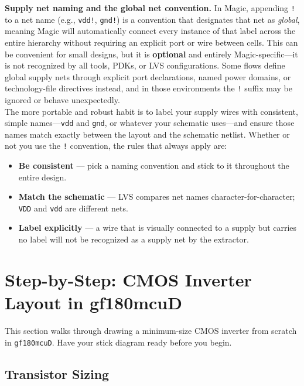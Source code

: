 \documentclass[11pt]{article}
\begin{document}
\begin{tipbox}
\textbf{Supply net naming and the global net convention.}
In Magic, appending \texttt{!} to a net name (e.g., \texttt{vdd!},
\texttt{gnd!}) is a convention that designates that net as
\emph{global}, meaning Magic will automatically connect every instance
of that label across the entire hierarchy without requiring an explicit
port or wire between cells.
This can be convenient for small designs, but it is \textbf{optional}
and entirely Magic-specific---it is not recognized by all tools, PDKs,
or LVS configurations.
Some flows define global supply nets through explicit port declarations,
named power domains, or technology-file directives instead, and in
those environments the \texttt{!} suffix may be ignored or behave
unexpectedly.\\
 
The more portable and robust habit is to label your supply wires with
consistent, simple names---\texttt{vdd} and \texttt{gnd}, or whatever
your schematic uses---and ensure those names match exactly between the
layout and the schematic netlist.
Whether or not you use the \texttt{!} convention, the rules that always
apply are:
\begin{itemize}
  \item \textbf{Be consistent} --- pick a naming convention and stick
        to it throughout the entire design.
  \item \textbf{Match the schematic} --- LVS compares net names
        character-for-character; \texttt{VDD} and \texttt{vdd} are
        different nets.
  \item \textbf{Label explicitly} --- a wire that is visually connected
        to a supply but carries no label will not be recognized as a
        supply net by the extractor.
\end{itemize}
\end{tipbox}

\section{Step-by-Step: CMOS Inverter Layout in gf180mcuD}

This section walks through drawing a minimum-size CMOS inverter from
scratch in \texttt{gf180mcuD}.
Have your stick diagram ready before you begin.

\subsection{Transistor Sizing}
\end{document}
